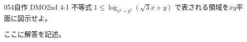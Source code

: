 \begin{thm}{054}{}{自作 DMO2nd 4-1}
 不等式 $1\le \log_{x^2+y^2}(\sqrt{3}x+y)$ で表される領域を$xy$平面に図示せよ。
\end{thm}

ここに解答を記述。
